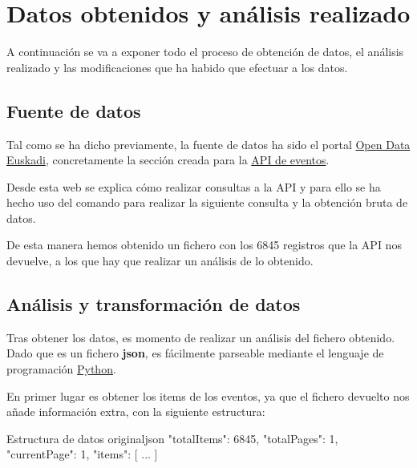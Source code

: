 \documentclass{\ClassPath/viu-tfm-template}
\begin{document}
\chapter{Datos obtenidos y análisis realizado}

A continuación se va a exponer todo el proceso de obtención de datos, el análisis realizado y las modificaciones que ha habido que efectuar a los datos.

\section{Fuente de datos}
Tal como se ha dicho previamente, la fuente de datos ha sido el portal \href{https://www.opendata.euskadi.eus/inicio/}{Open Data Euskadi}, concretamente la sección creada para la \href{https://www.opendata.euskadi.eus/api-culture/?api=culture_events}{API de eventos}.

Desde esta web se explica cómo realizar consultas a la API y para ello se ha hecho uso del comando  para realizar la siguiente consulta y la obtención bruta de datos.


De esta manera hemos obtenido un fichero  con los 6845 registros que la API nos devuelve, a los que hay que realizar un análisis de lo obtenido.


\section{Análisis y transformación de datos}
Tras obtener los datos, es momento de realizar un análisis del fichero obtenido. Dado que es un fichero \textbf{json}, es fácilmente parseable mediante el lenguaje de programación \href{URLhttps://www.python.org/}{Python}.

En primer lugar es obtener los items de los eventos, ya que el fichero devuelto nos añade información extra, con la siguiente estructura:

\begin{mycode}{Estructura de datos original}{json}{}
{
    "totalItems": 6845,
    "totalPages": 1,
    "currentPage": 1,
    "items": [
        ...
    ]
}
\end{mycode}
\end{document}
